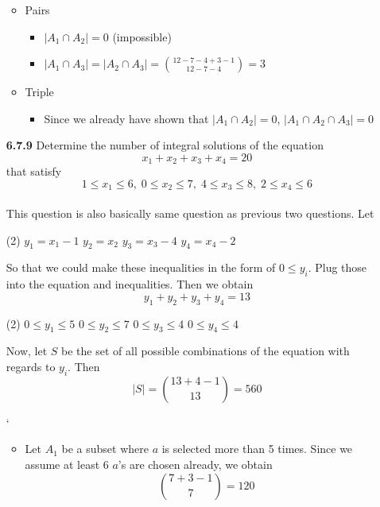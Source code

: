 \documentclass[12pt]{article}
\begin{document}
\begin{enumerate}
\begin{itemize}
        \item Pairs
        \begin{itemize}
            \item $|A_1\cap A_2| = 0$ (impossible)
            \item $|A_1\cap A_3| = |A_2\cap A_3| = \binom{12-7-4+3-1}{12-7-4} = 3$\\
        \end{itemize}
        
        \item Triple
        \begin{itemize}
            \item Since we already have shown that $|A_1\cap A_2| = 0$, $|A_1\cap A_2\cap A_3| = 0$
        \end{itemize}
    \end{itemize}

    \newpage
    \item[\bf 6.7.9] Determine the number of integral solutions of the equation
    $$x_1+x_2+x_3+x_4 = 20$$ that satisfy
    $$1\le x_1\le 6,\; 0\le x_2\le 7,\; 4\le x_3\le 8,\; 2\le x_4\le 6$$\\
    
    This question is also basically same question as previous two questions. Let 
    \begin{tasks}[style=itemize, column-sep=-35mm, label-align=left, label-offset={0mm}, label-width={3mm}, item-indent={40mm}](2)%
        \task $y_1 = x_1-1$
        \task $y_2 = x_2$
        \task $y_3 = x_3-4$
        \task $y_4 = x_4-2$
    \end{tasks}
    
    \vspace{1.5\baselineskip}
    So that we could make these inequalities in the form of $0\le y_i$. Plug those into the equation and inequalities. Then we obtain $$y_1+y_2+y_3+y_4 = 13$$
    \begin{tasks}[style=itemize, column-sep=-35mm, label-align=left, label-offset={0mm}, label-width={3mm}, item-indent={40mm}](2)%
        \task $0\le y_1\le 5$
        \task $0\le y_2\le 7$
        \task $0\le y_3\le 4$
        \task $0\le y_4\le 4$
    \end{tasks}

    Now, let $S$ be the set of all possible combinations of the equation with regards to $y_i$. Then 
    $$|S| = \binom{13+4-1}{13} = 560$$
    
    `\begin{itemize}
        \item Let $A_1$ be a subset where $a$ is selected more than 5 times. Since we assume at least 6 $a$'s are chosen already, we obtain
        $$\binom{7+3-1}{7} = 120$$
        

\end{itemize}
\end{enumerate}
\end{document}
